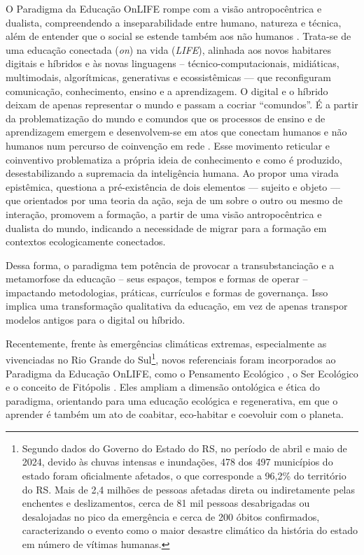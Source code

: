 \documentclass[portuguese]{textolivre}
\begin{document}
O Paradigma da Educação OnLIFE rompe com a visão antropocêntrica e dualista, compreendendo a inseparabilidade entre humano, natureza e técnica, além de entender que o social se estende também aos não humanos \cite{latour2012reagregando}. Trata-se de uma educação conectada (\textit{on}) na vida (\textit{LIFE}), alinhada aos novos habitares digitais e híbridos e às novas linguagens – técnico-computacionais, midiáticas, multimodais, algorítmicas, generativas e ecossistêmicas — que reconfiguram comunicação, conhecimento, ensino e a aprendizagem. O digital e o híbrido deixam de apenas representar o mundo e passam a cocriar “comundos”. É a partir da problematização do mundo e comundos que os processos de ensino e de aprendizagem emergem e desenvolvem-se em atos que conectam humanos e não humanos num percurso de coinvenção em rede \cite{schlemmer2024inteligencias}. Esse movimento reticular e coinventivo problematiza a própria ideia de conhecimento e como é produzido, desestabilizando a supremacia da inteligência humana. Ao propor uma virada epistêmica, questiona a pré-existência de dois elementos — sujeito e objeto — que orientados por uma teoria da ação, seja de um sobre o outro ou mesmo de interação, promovem a formação, a partir de uma visão antropocêntrica e dualista do mundo, indicando a necessidade de migrar para a formação em contextos ecologicamente conectados.

Dessa forma, o paradigma tem potência de provocar a transubstanciação e a metamorfose da educação – seus espaços, tempos e formas de operar – impactando metodologias, práticas, currículos e formas de governança. Isso implica uma transformação qualitativa da educação, em vez de apenas transpor modelos antigos para o digital ou híbrido. 

Recentemente, frente às emergências climáticas extremas, especialmente as vivenciadas no Rio Grande do Sul\footnote{Segundo dados do Governo do Estado do RS, no período de abril e maio de 2024, devido às chuvas intensas e inundações, 478 dos 497 municípios do estado foram oficialmente afetados, o que corresponde a 96,2\% do território do RS. Mais de 2,4 milhões de pessoas afetadas direta ou indiretamente pelas enchentes e deslizamentos, cerca de 81 mil pessoas desabrigadas ou desalojadas no pico da emergência e cerca de 200 óbitos confirmados, caracterizando o evento como o maior desastre climático da história do estado em número de vítimas humanas.},  novos referenciais foram incorporados ao Paradigma da Educação OnLIFE, como o Pensamento Ecológico \cite{morton2010ecologicalthought}, o Ser Ecológico \cite{morton2018beingecological} e o conceito de Fitópolis \cite{mancuso2024fitopolis}. Eles ampliam a dimensão ontológica e ética do paradigma, orientando para uma educação ecológica e regenerativa, em que o aprender é também um ato de coabitar, eco-habitar e coevoluir com o planeta.
\end{document}

